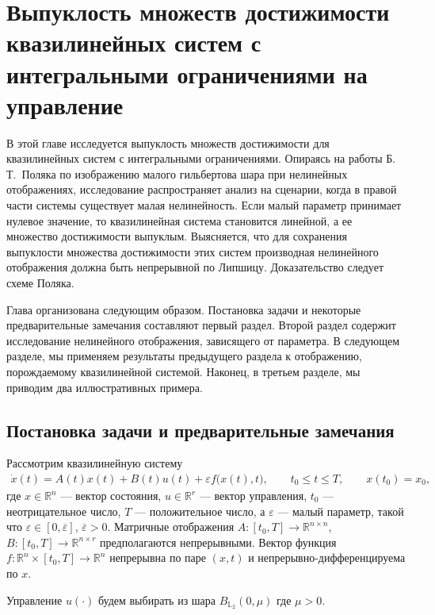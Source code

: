 \documentclass[../main.tex]{subfiles}
\begin{document}
\clearpage
\section{Выпуклость множеств достижимости квазилинейных систем с интегральными ограничениями на управление}
В этой главе исследуется выпуклость множеств достижимости для квазилинейных систем с интегральными ограничениями.  
Опираясь на работы Б.\,Т.~Поляка \cite{Polyak2001,Polyak2004} по изображению малого гильбертова шара при нелинейных отображениях, исследование распространяет анализ на сценарии, когда в правой части системы существует малая нелинейность. 
Если малый параметр принимает нулевое значение, то квазилинейная система становится линейной, а ее множество достижимости выпуклым. 
Выясняется, что для сохранения выпуклости множества достижимости этих систем производная нелинейного отображения должна быть непрерывной по Липшицу. Доказательство следует схеме Поляка.  

Глава организована следующим образом. 
Постановка задачи и некоторые предварительные замечания составляют первый раздел. 
Второй раздел содержит исследование нелинейного отображения, зависящего от параметра.  
В следующем разделе, мы применяем результаты предыдущего раздела к отображению, порождаемому квазилинейной системой. 
Наконец, в третьем разделе, мы приводим два иллюстративных примера.

\subsection{Постановка задачи и предварительные замечания}

Рассмотрим квазилинейную систему
\begin{gather}\label{sec3:nonlinear}
    \dot{x}(t) = A(t)x(t)+B(t)u(t)+\varepsilon f\big(x(t),t\big), \qquad t_0 \leqslant t \leqslant T, \qquad x(t_0) = x_0,
\end{gather}
где $ x \in \mathbb{R}^n $ --- вектор состояния, $ u \in \mathbb{R}^r $ --- вектор управления, $t_0$ --- неотрицательное число, $T$ --- положительное число, а $\varepsilon$ --- малый параметр, такой что $\varepsilon \in [0,\overline{\varepsilon}]$, $ \overline{\varepsilon} > 0$. Матричные отображения  $A:[t_0,T] \to \mathbb{R}^{n\times n} $, $B: [t_0,T] \to \mathbb{R}^{n\times r} $ предполагаются непрерывными. 
Вектор функция $f: \mathbb{R}^n \times [t_0,T] \to \mathbb{R}^n$ непрерывна по паре $(x,t)$ и непрерывно-дифференцируема по  $x$.

Управление $ u(\cdot) $ будем выбирать из шара $ B_{\mathbb{L}_2}(0,\mu) $ где $ \mu > 0$.
\end{document}
